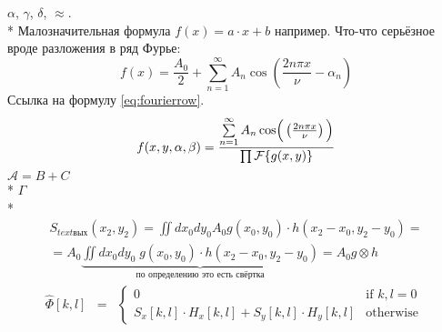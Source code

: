 \documentclass[a4paper,12pt]{report} %
\begin{document}
    \begin{center}
        \begin{minipage}{1\textwidth}
            $\alpha$, $\gamma$, $\delta$, $\approx$.\\*
            Малозначительная формула $f(x) = a\cdot x + b$ например.
            Что-что серьёзное вроде разложения в ряд Фурье:
            \begin{equation}\label{eq:fourierrow}
            f(x) =
            \frac{A_0}{2}
            +
            \sum \limits_{n=1}^{\infty} A_n \cos \left( \frac{2 n \pi x}{\nu} - \alpha_n \right)
            \end{equation}
            Ссылка на формулу \ref{eq:fourierrow}.
            \begin{equation}
                f(x, y, \alpha, \beta) =
                \frac{\sum \limits_{n=1}^{\infty} A_n \cos \Bigr(\left( \frac{2 n \pi x}{\nu} \right)\Bigl)}
                {\prod \mathcal{F} \{g(x,y)\}}
            \end{equation}
            $\mathcal{A} = B + C$\\*
            $\Gamma$\\*
            \begin{eqnarray}
                S_{text{вых}}(x_2, y_2) = \iint dx_0 dy_0 A_0 g(x_0, y_0) \cdot h(x_2-x_0, y_2-y_0) = \\
                = A_0 \underbrace{\iint dx_0 dy_0 \; g(x_0, y_0) \cdot h(x_2-x_0, y_2-y_0)}_{\text{по определению это есть свёртка}} = A_0 g \otimes h
            \end{eqnarray}
            \begin{equation}
                \begin{matrix} 
                    \hat{\Phi}[k,l]  & =
                    & \left\{
                    \begin{matrix}
                        0 & \mbox{if } k,l = 0 \\
                        S_x[k,l]\cdot H_x[k,l] + S_y[k,l]\cdot H_y[k,l] & \mbox{otherwise }
                    \end{matrix} \right. 
                \end{matrix}
            \end{equation}
        \end{minipage}
    \end{center}
    
    
\end{document}
